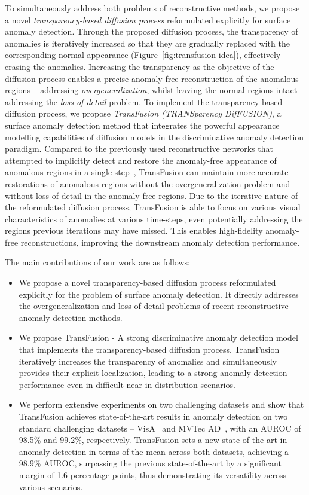 \documentclass[10pt,twocolumn,letterpaper]{article}
\begin{document}
To simultaneously address both problems of reconstructive methods, we propose a novel \textit{transparency-based diffusion process} reformulated explicitly for surface anomaly detection. Through the proposed diffusion process, the transparency of anomalies is iteratively increased so that they are gradually replaced with the corresponding normal appearance (Figure~\ref{fig:transfusion-idea}), effectively erasing the anomalies. Increasing the transparency as the objective of the diffusion process enables a precise anomaly-free reconstruction of the anomalous regions -- addressing \textit{overgeneralization}, whilst leaving the normal regions intact -- addressing the \textit{loss of detail} problem. 
To implement the transparency-based diffusion process, we propose \textit{TransFusion (TRANSparency DifFUSION)}, a surface anomaly detection method that integrates the powerful appearance modelling capabilities of diffusion models in the discriminative anomaly detection paradigm. Compared to the previously used reconstructive networks that attempted to implicitly detect and restore the anomaly-free appearance of anomalous regions in a single step~\cite{draem,dsr,zhang2023destseg}, TransFusion can maintain more accurate restorations of anomalous regions without the overgeneralization problem and without loss-of-detail in the anomaly-free regions. Due to the iterative nature of the reformulated diffusion process, TransFusion is able to focus on various visual characteristics of anomalies at various time-steps, even potentially addressing the regions previous iterations may have missed. This enables high-fidelity anomaly-free reconstructions, improving the downstream anomaly detection performance.

The main contributions of our work are as follows:
\begin{itemize}
    \item We propose a novel transparency-based diffusion process reformulated explicitly for the problem of surface anomaly detection. It directly addresses the overgeneralization and loss-of-detail problems of recent reconstructive anomaly detection methods.
    \item We propose TransFusion - A strong discriminative anomaly detection model that implements the transparency-based diffusion process. TransFusion iteratively increases the transparency of anomalies and simultaneously provides their explicit localization, leading to a strong anomaly detection performance even in difficult near-in-distribution scenarios.
    \item We perform extensive experiments on two challenging datasets and show that TransFusion achieves state-of-the-art results in anomaly detection on two standard challenging datasets -- VisA~\cite{visa} and MVTec AD~\cite{mvtec}, with an AUROC of 98.5\% and 99.2\%, respectively. TransFusion sets a new state-of-the-art in anomaly detection in terms of the mean across both datasets, achieving a 98.9\% AUROC, surpassing the previous state-of-the-art by a significant margin of 1.6 percentage points, thus demonstrating its versatility across various scenarios.
\end{itemize}
\end{document}
